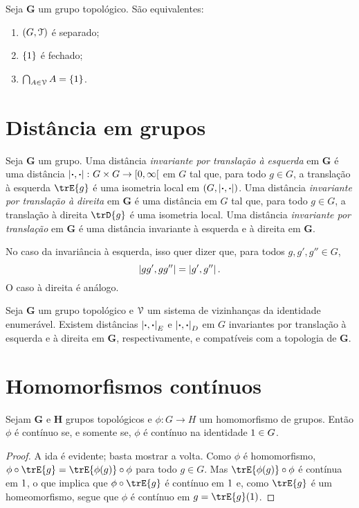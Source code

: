 \begin{proposition}
Seja $\bm G$ um grupo topológico. São equivalentes:
	\begin{enumerate}
	\item $(G,\mathcal{T})$ é separado;
	\item $\{1\}$ é fechado;
	\item $\bigcap_{A \in \mathcal{V}} A = \{1\}$.
	\end{enumerate}
\end{proposition}

\section{Distância em grupos}

\begin{definition}
Seja $\bm G$ um grupo. Uma distância \emph{invariante por translação à esquerda} em $\bm G$ é uma distância $\left\vert{\bm{\cdot}},{\bm{\cdot}}\right\vert\colon G \times G \to \left[{0},{\infty}\right[$ em $G$ tal que, para todo $g \in G$, a translação à esquerda $\trE{g}$ é uma isometria local em $(G,\left\vert{\bm{\cdot}},{\bm{\cdot}}\right\vert)$. Uma distância \emph{invariante por translação à direita} em $\bm G$ é uma distância em $G$ tal que, para todo $g \in G$, a translação à direita $\trD{g}$ é uma isometria local. Uma distância \emph{invariante por translação} em $\bm G$ é uma distância invariante à esquerda e à direita em $\bm G$.
\end{definition}

No caso da invariância à esquerda, isso quer dizer que, para todos $g,g',g'' \in G$,
	\begin{equation*}
	\left\vert{gg'},{gg''}\right\vert = \left\vert{g'},{g''}\right\vert.
	\end{equation*}
O caso à direita é análogo.

\begin{proposition}
Seja $\bm G$ um grupo topológico e $\mathcal{V}$ um sistema de vizinhanças da identidade enumerável. Existem distâncias $\left\vert{\bm{\cdot}},{\bm{\cdot}}\right\vert_E$ e $\left\vert{\bm{\cdot}},{\bm{\cdot}}\right\vert_D$ em $G$ invariantes por translação à esquerda e à direita em $\bm G$, respectivamente, e compatíveis com a topologia de $\bm G$.
\end{proposition}


\section{Homomorfismos contínuos}

\begin{proposition}
Sejam $\bm G$ e $\bm H$ grupos topológicos e $\phi\colon G \to H$ um homomorfismo de grupos. Então $\phi$ é contínuo se, e somente se, $\phi$ é contínuo na identidade $1 \in G$.
\end{proposition}
\begin{proof}
A ida é evidente; basta mostrar a volta. Como $\phi$ é homomorfismo, $\phi \circ \trE{g} = \trE{\phi(g)} \circ \phi$ para todo $g \in G$. Mas $\trE{\phi(g)} \circ \phi$ é contínua em $1$, o que implica que $\phi \circ \trE{g}$ é contínuo em $1$ e, como $\trE{g}$ é um homeomorfismo, segue que $\phi$ é contínuo em $g=\trE{g}(\id)$.
\end{proof}

